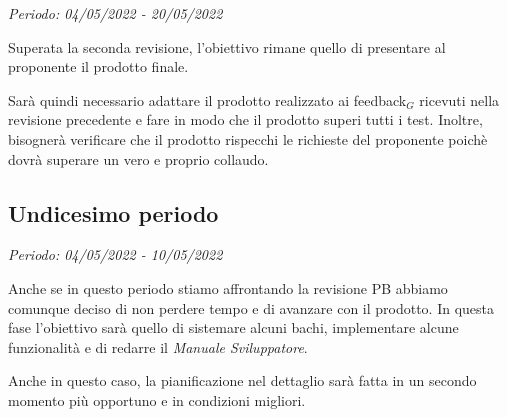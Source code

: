 \textit{Periodo: 04/05/2022 - 20/05/2022}

Superata la seconda revisione, l'obiettivo rimane quello di presentare al proponente il prodotto finale.

Sarà quindi necessario adattare il prodotto realizzato ai feedback$_G$ ricevuti nella revisione precedente e fare in modo che il prodotto superi tutti i test. Inoltre, bisognerà
verificare che il prodotto rispecchi le richieste del proponente poichè dovrà superare un vero e proprio collaudo.

\subsection{Undicesimo periodo}
\textit{Periodo: 04/05/2022 - 10/05/2022}

Anche se in questo periodo stiamo affrontando la revisione PB abbiamo comunque deciso di non perdere tempo e di avanzare con il prodotto. In questa fase l'obiettivo sarà quello di sistemare alcuni bachi, implementare alcune funzionalità e di redarre il \textit{Manuale Sviluppatore}.


Anche in questo caso, la pianificazione nel dettaglio sarà fatta in un secondo momento più opportuno e in condizioni migliori.
